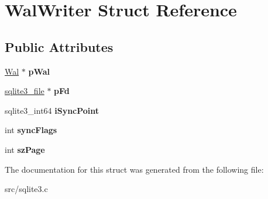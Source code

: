 \hypertarget{struct_wal_writer}{\section{Wal\-Writer Struct Reference}
\label{struct_wal_writer}
}
\subsection*{Public Attributes}
\begin{DoxyCompactItemize}
\item 
\hypertarget{struct_wal_writer_a3ed1cabab4a2f0572ec04d2a174e5bf9}{\hyperlink{struct_wal}{Wal} $\ast$ {\bfseries p\-Wal}}\label{struct_wal_writer_a3ed1cabab4a2f0572ec04d2a174e5bf9}

\item 
\hypertarget{struct_wal_writer_a0c98cddd084b97d9f531fa71b92ef40a}{\hyperlink{structsqlite3__file}{sqlite3\-\_\-file} $\ast$ {\bfseries p\-Fd}}\label{struct_wal_writer_a0c98cddd084b97d9f531fa71b92ef40a}

\item 
\hypertarget{struct_wal_writer_a1227aea1e12b6b409e8a7cdbae43588e}{sqlite3\-\_\-int64 {\bfseries i\-Sync\-Point}}\label{struct_wal_writer_a1227aea1e12b6b409e8a7cdbae43588e}

\item 
\hypertarget{struct_wal_writer_acc8dcbdc9b91bae4799b5de113742ae6}{int {\bfseries sync\-Flags}}\label{struct_wal_writer_acc8dcbdc9b91bae4799b5de113742ae6}

\item 
\hypertarget{struct_wal_writer_aa161832c97830aed52410747ebde5e6e}{int {\bfseries sz\-Page}}\label{struct_wal_writer_aa161832c97830aed52410747ebde5e6e}

\end{DoxyCompactItemize}


The documentation for this struct was generated from the following file\-:\begin{DoxyCompactItemize}
\item 
src/sqlite3.\-c\end{DoxyCompactItemize}
